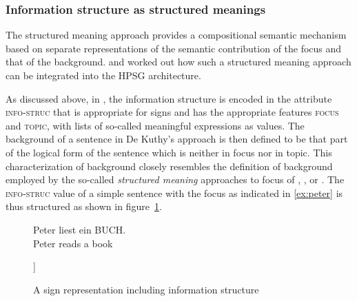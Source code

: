 \documentclass[output=paper]{langsci/langscibook}
\begin{document}
\subsubsection{Information structure as structured meanings \citep{deKuthy2002a}}
\label{sec:struc-meaning}
The structured meaning approach
\citep{Stechow81a-u,Jacobs83a,Krifka92a-u-kopiert} provides a
compositional semantic mechanism based on separate representations of
the semantic contribution of the focus and that of the
background. \citet{deKuthy2002a} and \cite{Webelhuth2007a-u} worked
out how such a structured meaning approach can be integrated into the HPSG
architecture.

As discussed above, in \cite{deKuthy2002a}, the information structure
is encoded in the attribute \textsc{info-struc} that is appropriate
for signs and has the appropriate features \textsc{focus} and
\textsc{topic}, with lists of so-called meaningful expressions as
values. The background of a sentence in De Kuthy's approach is then defined
to be that part of the logical form of the sentence which is neither
in focus nor in topic.  This characterization of background closely
resembles the definition of background employed by the so-called
\textit{structured meaning} approaches to focus of
\cite{Stechow81a-u}, \cite{Jacobs83a}, or \cite{Krifka92a-u-kopiert}.
The \textsc{info-struc} value of a simple sentence with the focus as
indicated in \ref{ex:peter} is thus structured as shown in
figure~\ref{fig:focus-backgr}.
\begin{figure}[htb!]
\begin{exe}
  \ex\label{ex:peter} \gll Peter {\LF}liest ein BUCH.{\RF}\\
           Peter {}reads a book\\
\end{exe}
  \begin{center}
    \begin{avm}
      [s|loc|cont|lf  $\exists x \[book'\(x\) \wedge read'\(p,x\)\]$\\
       info-struc  [focus & \XlstI{$\lambda y \exists x\[book'\(x\) \wedge read'\(y,x\)\]$}\\
                     topic & \elst]
      ]
    \end{avm}
    \caption{A sign representation including information structure}
    \label{fig:focus-backgr}
  \end{center}\unskip
\end{figure}
\end{document}
